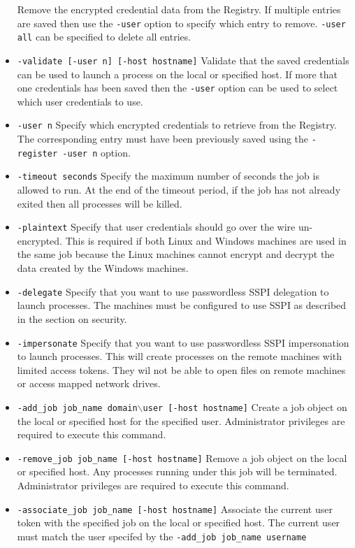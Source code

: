 \documentclass[dvipdfm,11pt]{article}
\begin{document}
\begin{itemize}
Remove the encrypted credential data from the Registry.  If multiple entries are
saved then use the \texttt{-user} option to specify which entry to remove.
\texttt{-user all} can be specified to delete all entries.
\item \texttt{-validate [-user n] [-host hostname]}
Validate that the saved credentials can be used to launch a process on the local
or specified host.  If more that one credentials has been saved then the 
\texttt{-user} option can be used to select which user credentials to use.
\item \texttt{-user n}
Specify which encrypted credentials to retrieve from the Registry.  The corresponding
entry must have been previously saved using the \texttt{-register -user n} option.
\item \texttt{-timeout seconds}
Specify the maximum number of seconds the job is allowed to run.  At the end of
the timeout period, if the job has not already exited then all processes will
be killed.
\item \texttt{-plaintext}
Specify that user credentials should go over the wire un-encrypted.  This is
required if both Linux and Windows machines are used in the same job because
the Linux machines cannot encrypt and decrypt the data created by the Windows
machines.
\item \texttt{-delegate}
Specify that you want to use passwordless SSPI delegation to launch processes.
The machines must be configured to use SSPI as described in the section on 
security.
\item \texttt{-impersonate}
Specify that you want to use passwordless SSPI impersonation to launch processes.
This will create processes on the remote machines with limited access tokens.
They wil not be able to open files on remote machines or access mapped network
drives.
\item \texttt{-add\_job job\_name domain$\backslash$user [-host hostname]}
Create a job object on the local or specified host for the specified user.
Administrator privileges are required to execute this command.
\item \texttt{-remove\_job job\_name [-host hostname]}
Remove a job object on the local or specified host.  Any processes running under
this job will be terminated.  Administrator privileges are required to execute
this command.
\item \texttt{-associate\_job job\_name [-host hostname]}
Associate the current user token with the specified job on the local or specified
host.  The current user must match the user specifed by the \texttt{-add\_job job\_name username}

\end{itemize}
\end{document}
